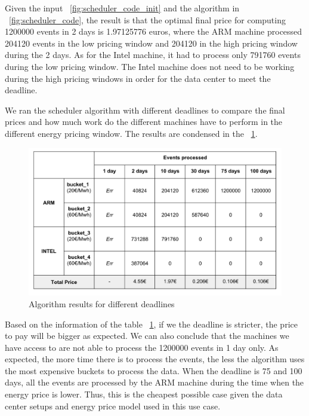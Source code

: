 \vspace{10mm}

Given the input ~\ref{fig:scheduler_code_init} and the algorithm in ~\ref{fig:scheduler_code}, the result is that the optimal final price for computing 1200000 events in 2 days is 1.97125776 euros, where the ARM machine processed 204120 events in the low pricing window and 204120 in the high pricing window during the 2 days. As for the Intel machine, it had to process only 791760 events during the low pricing window. The Intel machine does not need to be working during the high pricing windows in order for the data center to meet the deadline.

\vspace{10mm}


We ran the scheduler algorithm with different deadlines to compare the final prices and how much work do the different machines have to perform in the different energy pricing window. The results are condensed in the  ~\ref{fig:prices_final_table}.

\begin{figure}[h]
  \centering
    \includegraphics[width=150mm]{"img/prices_final_table"}
    \caption{Algorithm results for different deadlines}
    \label{fig:prices_final_table}
\end{figure}


Based on the information of the table ~\ref{fig:prices_final_table}, if we the deadline is stricter, the price to pay will be bigger as expected. We can also conclude that the machines we have access to are not able to process the 1200000 events in 1 day only. As expected, the more time there is to process the events, the less the algorithm uses the most expensive buckets to process the data. When the deadline is 75 and 100 days, all the events are processed by the ARM machine during the time when the energy price is lower. Thus, this is the cheapest possible case given the data center setups and energy price model used in this use case.



